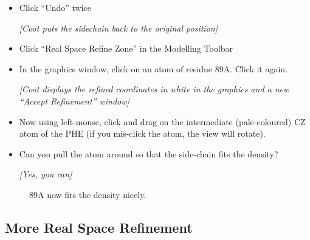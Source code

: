 \documentclass{article}
\begin{document}
\begin{itemize}
\item Click \textsf{``Undo''} twice

  \textsl{ [\emph{Coot} puts the sidechain back to the original position] }

\item Click \textsf{``Real Space Refine Zone''} in the Modelling Toolbar

\item In the graphics window, click on an atom of residue 89A.  Click
  it again.

  \textsl{ [\emph{Coot} displays the refined coordinates in white in the
    graphics and a new ``Accept Refinement'' window]}

\item Now using left-mouse, click and drag on the intermediate (pale-coloured)
  CZ atom of the PHE (if you mis-click the atom, the view will rotate).

\item Can you pull the atom around so that the side-chain fits the
  density?

  \emph{ [Yes, you can] }

\end{itemize}

  \begin{figure}[htbp]
    \begin{center}
      \leavevmode
      \epsfxsize 70mm
      \caption{89A now fits the density nicely.}
      \label{fig:89a-coot}
    \end{center}
  \end{figure}

\subsection{More Real Space Refinement}
\end{document}
